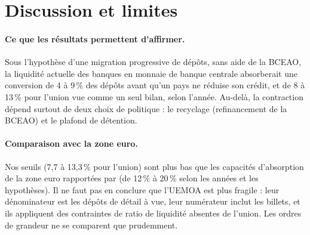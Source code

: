 \documentclass[11pt,a4paper]{article}
\begin{document}
	\newpage
	
	\section{Discussion et limites}\label{sec:discussion}
	
	\paragraph{Ce que les résultats permettent d'affirmer.} Sous l'hypothèse d'une migration progressive de dépôts, sans aide de la BCEAO, la liquidité actuelle des banques en monnaie de banque centrale absorberait une conversion de 4 à 9\,\% des dépôts avant qu'un pays ne réduise son crédit, et de 8 à 13\,\% pour l'union vue comme un seul bilan, selon l'année. Au-delà, la contraction dépend surtout de deux choix de politique : le recyclage (refinancement de la BCEAO) et le plafond de détention.
	
	\paragraph{Comparaison avec la zone euro.} Nos seuils (7,7 à 13,3\,\% pour l'union) sont plus bas que les capacités d'absorption de la zone euro rapportées par \citet{meller2023} (de 12\,\% à 20\,\% selon les années et les hypothèses). Il ne faut pas en conclure que l'UEMOA est plus fragile : leur dénominateur est les dépôts de détail à vue, leur numérateur inclut les billets, et ils appliquent des contraintes de ratio de liquidité absentes de l'union. Les ordres de grandeur ne se comparent que prudemment.
	
\end{document}

